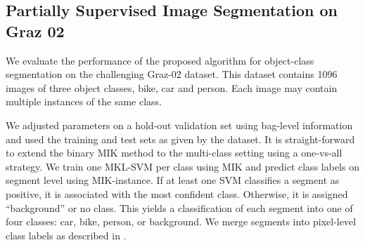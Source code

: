 \documentclass{llncs} %
\begin{document}
\subsection{Partially Supervised Image Segmentation on Graz 02}

We evaluate the performance of the proposed algorithm for object-class
segmentation on the challenging Graz-02 dataset.
This dataset contains 1096 images of three object classes, bike, car and person.
Each image may contain multiple instances of the same class.

We adjusted parameters on a hold-out validation set using bag-level information and used the
training and test sets as given by the dataset.
It is straight-forward to extend the binary MIK method to the multi-class
setting using a one-vs-all strategy.
We train one MKL-SVM per class using MIK and predict class labels on segment level
using MIK-instance. If at least one SVM classifies a segment as positive,
it is associated with the most confident class. Otherwise, it is assigned
``background'' or no class.
This yields a classification of each segment into one of four classes: car, bike, person,
or background. We merge segments into pixel-level class labels as described
in .
\end{document}

